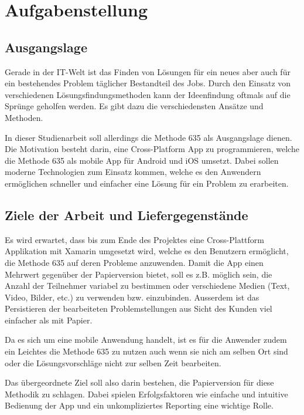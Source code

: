 \section{Aufgabenstellung}

\subsection{Ausgangslage}
Gerade in der IT-Welt ist das Finden von Lösungen für ein neues aber auch für ein bestehendes Problem täglicher Bestandteil des Jobs. Durch den Einsatz von verschiedenen Lösungs\-findungs\-methoden kann der Ideenfindung oftmals auf die Sprünge geholfen werden. Es gibt dazu die verschiedensten Ansätze und Methoden. 

In dieser Studienarbeit soll allerdings die Methode 635 als Ausgangslage dienen. Die Motivation besteht darin, eine Cross-Platform App zu programmieren, welche die Methode 635 als mobile App für Android und iOS umsetzt. Dabei sollen moderne Technologien zum Einsatz kommen, welche es den Anwendern ermöglichen schneller und einfacher eine Lösung für ein Problem zu erarbeiten. 

\subsection{Ziele der Arbeit und Liefergegenstände}

Es wird erwartet, dass bis zum Ende des Projektes eine Cross-Plattform Applikation mit Xamarin umgesetzt wird, welche es den Benutzern ermöglicht, die Methode 635 auf deren Probleme anzuwenden. Damit die App einen Mehrwert gegenüber der Papierversion bietet, soll es z.B. möglich sein, die Anzahl der Teilnehmer variabel zu bestimmen oder verschiedene Medien (Text, Video, Bilder, etc.) zu verwenden bzw. einzubinden. Ausserdem ist das Persistieren der bearbeiteten Problemstellungen aus Sicht des Kunden viel einfacher als mit Papier.

Da es sich um eine mobile Anwendung handelt, ist es für die Anwender zudem ein Leichtes die Methode 635 zu nutzen auch wenn sie nich am selben Ort sind oder die Lösungsvorschläge nicht zur selben Zeit bearbeiten. 

Das übergeordnete Ziel soll also darin bestehen, die Papierversion für diese Methodik zu schlagen. Dabei spielen Erfolgsfaktoren wie einfache und intuitive Bedienung der App und ein unkompliziertes Reporting eine wichtige Rolle.
